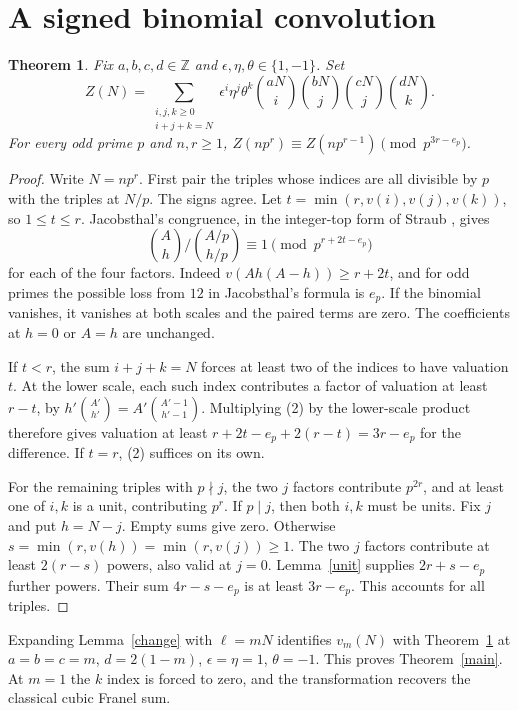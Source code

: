 \documentclass[11pt]{article}
\newtheorem{theorem}{Theorem}
\newcommand{\Z}{\mathbb Z}
\begin{document}
\section{A signed binomial convolution}
\begin{theorem}\label{general}
Fix $a,b,c,d\in\Z$ and $\epsilon,\eta,\theta\in\{1,-1\}$. Set
\[
 Z(N)=\sum_{\substack{i,j,k\ge0\\i+j+k=N}}
   \epsilon^i\eta^j\theta^k\binom{aN}i\binom{bN}j\binom{cN}j\binom{dN}k .
\]
For every odd prime $p$ and $n,r\ge1$,
$Z(np^r)\equiv Z(np^{r-1})\pmod {p^{3r-e_p}}$.
\end{theorem}
\begin{proof}
Write $N=np^r$. First pair the triples whose indices are all divisible by $p$ with the triples at $N/p$. The signs agree. Let $t=\min(r,v(i),v(j),v(k))$, so $1\le t\le r$. Jacobsthal's congruence, in the integer-top form of Straub \cite[Lemma 5.1]{straub}, gives
\[
 \binom Ah/\binom{A/p}{h/p}\equiv1\pmod{p^{r+2t-e_p}} \tag{2}
\]
for each of the four factors. Indeed $v(Ah(A-h))\ge r+2t$, and for odd primes the possible loss from $12$ in Jacobsthal's formula is $e_p$. If the binomial vanishes, it vanishes at both scales and the paired terms are zero. The coefficients at $h=0$ or $A=h$ are unchanged.

If $t<r$, the sum $i+j+k=N$ forces at least two of the indices to have valuation $t$. At the lower scale, each such index contributes a factor of valuation at least $r-t$, by $h'\binom{A'}{h'}=A'\binom{A'-1}{h'-1}$. Multiplying (2) by the lower-scale product therefore gives valuation at least $r+2t-e_p+2(r-t)=3r-e_p$ for the difference. If $t=r$, (2) suffices on its own.

For the remaining triples with $p\nmid j$, the two $j$ factors contribute $p^{2r}$, and at least one of $i,k$ is a unit, contributing $p^r$. If $p\mid j$, then both $i,k$ must be units. Fix $j$ and put $h=N-j$. Empty sums give zero. Otherwise $s=\min(r,v(h))=\min(r,v(j))\ge1$. The two $j$ factors contribute at least $2(r-s)$ powers, also valid at $j=0$. Lemma~\ref{unit} supplies $2r+s-e_p$ further powers. Their sum $4r-s-e_p$ is at least $3r-e_p$. This accounts for all triples.
\end{proof}

Expanding Lemma~\ref{change} with $\ell=mN$ identifies $v_m(N)$ with Theorem~\ref{general} at $a=b=c=m$, $d=2(1-m)$, $\epsilon=\eta=1$, $\theta=-1$. This proves Theorem~\ref{main}. At $m=1$ the $k$ index is forced to zero, and the transformation recovers the classical cubic Franel sum.
\end{document}
